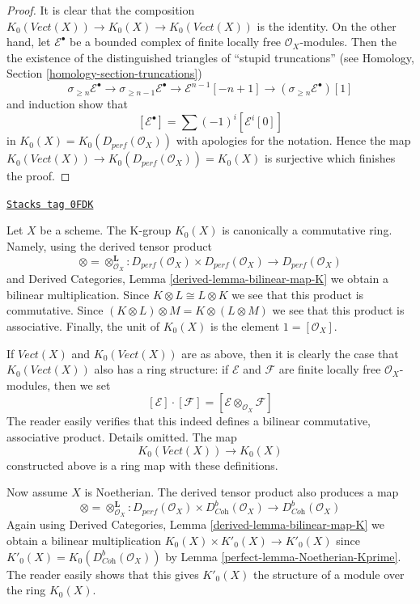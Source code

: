 \begin{proof}
\medskip\noindent
It is clear that the composition
$K_0(\textit{Vect}(X)) \to K_0(X) \to K_0(\textit{Vect}(X))$
is the identity. On the other hand, let $\mathcal{E}^\bullet$
be a bounded complex of finite locally free $\mathcal{O}_X$-modules.
Then the the existence of the distinguished triangles
of ``stupid truncations''
(see Homology, Section \ref{homology-section-truncations})
$$
\sigma_{\geq n}\mathcal{E}^\bullet \to
\sigma_{\geq n - 1}\mathcal{E}^\bullet \to
\mathcal{E}^{n - 1}[-n + 1] \to
(\sigma_{\geq n}\mathcal{E}^\bullet)[1]
$$
and induction show that
$$
[\mathcal{E}^\bullet] = \sum (-1)^i[\mathcal{E}^i[0]]
$$
in $K_0(X) = K_0(D_{perf}(\mathcal{O}_X))$ with apologies for the notation.
Hence the map $K_0(\textit{Vect}(X)) \to K_0(D_{perf}(\mathcal{O}_X)) = K_0(X)$
is surjective which finishes the proof.
\end{proof}

\begin{remark}[K ring]
\label{perfect-remark-K-ring}
\href{https://stacks.math.columbia.edu/tag/0FDK}{\texttt{Stacks tag 0FDK}}

Let $X$ be a scheme. The K-group $K_0(X)$ is canonically a commutative ring.
Namely, using the derived tensor product
$$
\otimes = \otimes^\mathbf{L}_{\mathcal{O}_X} :
D_{perf}(\mathcal{O}_X) \times D_{perf}(\mathcal{O}_X)
\longrightarrow
D_{perf}(\mathcal{O}_X)
$$
and Derived Categories, Lemma \ref{derived-lemma-bilinear-map-K}
we obtain a bilinear multiplication. Since $K \otimes L \cong L \otimes K$
we see that this product is commutative. Since
$(K \otimes L) \otimes M = K \otimes (L \otimes M)$
we see that this product is associative.
Finally, the unit of $K_0(X)$ is the element $1 = [\mathcal{O}_X]$.

\medskip\noindent
If $\textit{Vect}(X)$ and $K_0(\textit{Vect}(X))$ are as above, then
it is clearly the case that $K_0(\textit{Vect}(X))$ also has a
ring structure: if $\mathcal{E}$ and $\mathcal{F}$ are finite locally free
$\mathcal{O}_X$-modules, then we set
$$
[\mathcal{E}] \cdot [\mathcal{F}] =
[\mathcal{E} \otimes_{\mathcal{O}_X} \mathcal{F}]
$$
The reader easily verifies that this indeed defines a bilinear
commutative, associative product. Details omitted. The map
$$
K_0(\textit{Vect}(X)) \longrightarrow K_0(X)
$$
constructed above is a ring map with these definitions.

\medskip\noindent
Now assume $X$ is Noetherian. The derived tensor product also produces
a map
$$
\otimes = \otimes^\mathbf{L}_{\mathcal{O}_X} :
D_{perf}(\mathcal{O}_X) \times D^b_{\textit{Coh}}(\mathcal{O}_X)
\longrightarrow
D^b_{\textit{Coh}}(\mathcal{O}_X)
$$
Again using Derived Categories, Lemma \ref{derived-lemma-bilinear-map-K}
we obtain a bilinear multiplication $K_0(X) \times K'_0(X) \to K'_0(X)$
since $K'_0(X) = K_0(D^b_{\textit{Coh}}(\mathcal{O}_X))$ by
Lemma \ref{perfect-lemma-Noetherian-Kprime}.
The reader easily shows that this gives $K'_0(X)$ the structure
of a module over the ring $K_0(X)$.
\end{remark}

